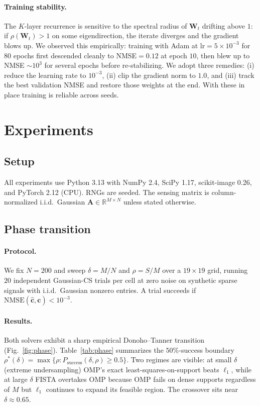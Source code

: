 \documentclass{article}
\begin{document}
\paragraph{Training stability.} The $K$-layer recurrence is sensitive to the spectral radius of $\boldsymbol{W}_t$ drifting above $1$: if $\rho(\boldsymbol{W}_t) > 1$ on some eigendirection, the iterate diverges and the gradient blows up. We observed this empirically: training with Adam at $\text{lr}{=}5{\times}10^{-3}$ for $80$ epochs first descended cleanly to NMSE${=}0.12$ at epoch $10$, then blew up to NMSE $\sim 10^3$ for several epochs before re-stabilizing. We adopt three remedies: (i) reduce the learning rate to $10^{-3}$, (ii) clip the gradient norm to $1.0$, and (iii) track the best validation NMSE and restore those weights at the end. With these in place training is reliable across seeds.


\section{Experiments}
\label{sec:experiments}

\subsection{Setup}

All experiments use Python 3.13 with NumPy 2.4, SciPy 1.17, scikit-image 0.26, and PyTorch 2.12 (CPU). RNGs are seeded. The sensing matrix is column-normalized i.i.d.\ Gaussian $\boldsymbol{A} \in \mathbb{R}^{M \times N}$ unless stated otherwise.

\subsection{Phase transition}
\label{sec:phase}

\paragraph{Protocol.} We fix $N = 200$ and sweep $\delta = M/N$ and $\rho = S/M$ over a $19{\times}19$ grid, running $20$ independent Gaussian-CS trials per cell at zero noise on synthetic sparse signals with i.i.d.\ Gaussian nonzero entries. A trial succeeds if $\mathrm{NMSE}(\hat{\boldsymbol{c}}, \boldsymbol{c}) < 10^{-3}$.

\paragraph{Results.} Both solvers exhibit a sharp empirical Donoho--Tanner transition (Fig.~\ref{fig:phase}). Table~\ref{tab:phase} summarizes the $50\%$-success boundary $\rho^\ast(\delta) = \max\{\rho : P_\text{success}(\delta,\rho) \ge 0.5\}$. Two regimes are visible: at small $\delta$ (extreme undersampling) OMP's exact least-squares-on-support beats $\ell_1$, while at large $\delta$ FISTA overtakes OMP because OMP fails on dense supports regardless of $M$ but $\ell_1$ continues to expand its feasible region. The crossover sits near $\delta \approx 0.65$.
\end{document}
